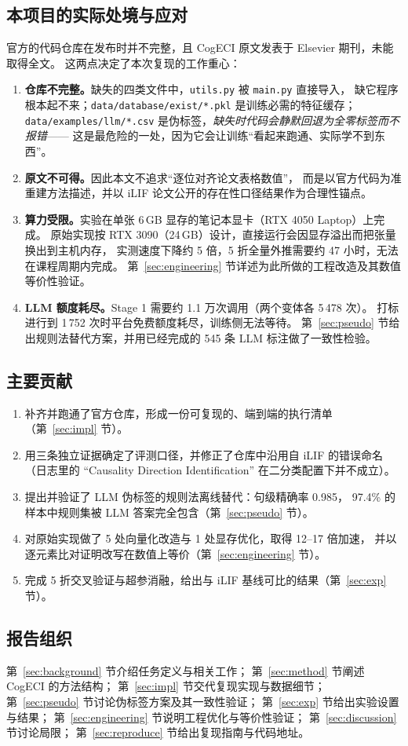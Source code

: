 \subsection{本项目的实际处境与应对}

官方的代码仓库在发布时并不完整，且 CogECI 原文发表于 Elsevier 期刊，未能取得全文。
这两点决定了本次复现的工作重心：

\begin{enumerate}
  \item \textbf{仓库不完整。}缺失的四类文件中，\texttt{utils.py} 被 \texttt{main.py} 直接导入，
        缺它程序根本起不来；\texttt{data/database/exist/*.pkl} 是训练必需的特征缓存；
        \texttt{data/examples/llm/*.csv} 是伪标签，\emph{缺失时代码会静默回退为全零标签而不报错}——
        这是最危险的一处，因为它会让训练“看起来跑通、实际学不到东西”。
  \item \textbf{原文不可得。}因此本文不追求“逐位对齐论文表格数值”，
        而是以官方代码为准重建方法描述，并以 iLIF 论文公开的存在性口径结果作为合理性锚点。
  \item \textbf{算力受限。}实验在单张 6\,GB 显存的笔记本显卡（RTX 4050 Laptop）上完成。
        原始实现按 RTX 3090（24\,GB）设计，直接运行会因显存溢出而把张量换出到主机内存，
        实测速度下降约 5 倍，5 折全量外推需要约 47 小时，无法在课程周期内完成。
        第~\ref{sec:engineering} 节详述为此所做的工程改造及其数值等价性验证。
  \item \textbf{LLM 额度耗尽。}Stage 1 需要约 1.1 万次调用（两个变体各 5\,478 次）。
        打标进行到 1\,752 次时平台免费额度耗尽，训练侧无法等待。
        第~\ref{sec:pseudo} 节给出规则法替代方案，并用已经完成的 545 条 LLM 标注做了一致性检验。
\end{enumerate}

\subsection{主要贡献}

\begin{enumerate}
  \item 补齐并跑通了官方仓库，形成一份可复现的、端到端的执行清单（第~\ref{sec:impl} 节）。
  \item 用三条独立证据确定了评测口径，并修正了仓库中沿用自 iLIF 的错误命名
        （日志里的 “Causality Direction Identification” 在二分类配置下并不成立）。
  \item 提出并验证了 LLM 伪标签的规则法离线替代：句级精确率 0.985，
        97.4\% 的样本中规则集被 LLM 答案完全包含（第~\ref{sec:pseudo} 节）。
  \item 对原始实现做了 5 处向量化改造与 1 处显存优化，取得 12--17 倍加速，
        并以逐元素比对证明改写在数值上等价（第~\ref{sec:engineering} 节）。
  \item 完成 5 折交叉验证与超参消融，给出与 iLIF 基线可比的结果（第~\ref{sec:exp} 节）。
\end{enumerate}

\subsection{报告组织}

第~\ref{sec:background} 节介绍任务定义与相关工作；
第~\ref{sec:method} 节阐述 CogECI 的方法结构；
第~\ref{sec:impl} 节交代复现实现与数据细节；
第~\ref{sec:pseudo} 节讨论伪标签方案及其一致性验证；
第~\ref{sec:exp} 节给出实验设置与结果；
第~\ref{sec:engineering} 节说明工程优化与等价性验证；
第~\ref{sec:discussion} 节讨论局限；
第~\ref{sec:reproduce} 节给出复现指南与代码地址。
